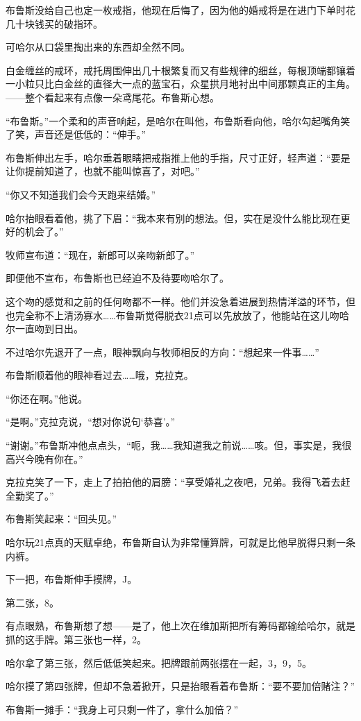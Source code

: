 \documentclass[../main]{subfiles}
\begin{document}
布鲁斯没给自己也定一枚戒指，他现在后悔了，因为他的婚戒将是在进门下单时花几十块钱买的破指环。

可哈尔从口袋里掏出来的东西却全然不同。

白金缠丝的戒环，戒托周围伸出几十根繁复而又有些规律的细丝，每根顶端都镶着一小粒只比白金丝的直径大一点的蓝宝石，众星拱月地衬出中间那颗真正的主角。——整个看起来有点像一朵鸢尾花。布鲁斯心想。

“布鲁斯。”一个柔和的声音响起，是哈尔在叫他，布鲁斯看向他，哈尔勾起嘴角笑了笑，声音还是低低的：“伸手。”

布鲁斯伸出左手，哈尔垂着眼睛把戒指推上他的手指，尺寸正好，轻声道：“要是让你提前知道了，也就不能叫惊喜了，对吧。”

“你又不知道我们会今天跑来结婚。”

哈尔抬眼看着他，挑了下眉：“我本来有别的想法。但，实在是没什么能比现在更好的机会了。”

牧师宣布道：“现在，新郎可以亲吻新郎了。”

即便他不宣布，布鲁斯也已经迫不及待要吻哈尔了。

这个吻的感觉和之前的任何吻都不一样。他们并没急着进展到热情洋溢的环节，但也完全称不上清汤寡水……布鲁斯觉得脱衣21点可以先放放了，他能站在这儿吻哈尔一直吻到日出。

不过哈尔先退开了一点，眼神飘向与牧师相反的方向：“想起来一件事\ldots\ldots”

布鲁斯顺着他的眼神看过去……哦，克拉克。

“你还在啊。”他说。

“是啊。”克拉克说，“想对你说句`恭喜'。”

“谢谢。”布鲁斯冲他点点头，“呃，我……我知道我之前说……咳。但，事实是，我很高兴今晚有你在。”

克拉克笑了一下，走上了拍拍他的肩膀：“享受婚礼之夜吧，兄弟。我得飞着去赶全勤奖了。”

布鲁斯笑起来：“回头见。”

哈尔玩21点真的天赋卓绝，布鲁斯自认为非常懂算牌，可就是比他早脱得只剩一条内裤。

下一把，布鲁斯伸手摸牌，J。

第二张，8。

有点眼熟，布鲁斯想了想——是了，他上次在维加斯把所有筹码都输给哈尔，就是抓的这手牌。第三张也一样，2。

哈尔拿了第三张，然后低低笑起来。把牌跟前两张摆在一起，3，9，5。

哈尔摸了第四张牌，但却不急着掀开，只是抬眼看着布鲁斯：“要不要加倍赌注？”

布鲁斯一摊手：“我身上可只剩一件了，拿什么加倍？”
\end{document}
